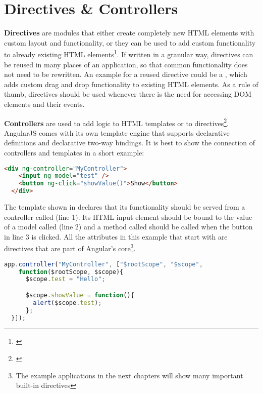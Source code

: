 \section{Directives \& Controllers}
\label{sect:directives_controllers}

\textbf{Directives} are modules that either create completely new HTML elements with custom layout and functionality, or they can be used to add custom functionality to already existing HTML elements\footnote{\cite[p. 61ff]{lerner2013ngbook}}. If written in a granular way, directives can be reused in many places of an application, so that common functionality does not need to be rewritten. An example for a reused directive could be a , which adds custom drag and drop functionality to existing HTML elements. As a rule of thumb, directives should be used whenever there is the need for accessing DOM elements and their events.


\textbf{Controllers} are used to add logic to HTML templates or to directives\footnote{\cite[p. 25ff]{lerner2013ngbook}}. AngularJS comes with its own template engine that supports declarative definitions and declarative two-way bindings. It is best to show the connection of controllers and templates in a short example:

\begin{lstlisting}[language=HTML, caption=A simple AngularJS template, label=lst:angular-template]
  <div ng-controller="MyController">
    <input ng-model="test" />
    <button ng-click="showValue()">Show</button>
  </div>
\end{lstlisting}

The template shown in  declares that its functionality should be served from a controller called  (line 1). Its HTML input element should be bound to the value of a model called  (line 2) and a method called  should be called when the button in line 3 is clicked. All the attributes in this example that start with  are directives that are part of Angular's core\footnote{The example applications in the next chapters will show many important built-in directives}.

\begin{lstlisting}[language=JavaScript, caption=A simple AngularJS controller, label=lst:angular-controller]
  app.controller("MyController", ["$rootScope", "$scope",
    function($rootScope, $scope){
      $scope.test = "Hello";

      $scope.showValue = function(){
        alert($scope.test);
      };
  }]);
\end{lstlisting}

